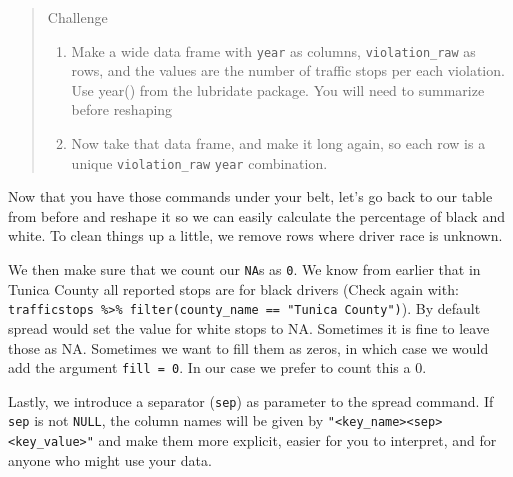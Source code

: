 \documentclass[]{book}
\newenvironment{Shaded}{\begin{snugshade}}{\end{snugshade}}
\newcommand{\KeywordTok}[1]{\textcolor[rgb]{0.13,0.29,0.53}{\textbf{#1}}}
\newcommand{\DataTypeTok}[1]{\textcolor[rgb]{0.13,0.29,0.53}{#1}}
\newcommand{\DecValTok}[1]{\textcolor[rgb]{0.00,0.00,0.81}{#1}}
\newcommand{\StringTok}[1]{\textcolor[rgb]{0.31,0.60,0.02}{#1}}
\newcommand{\OperatorTok}[1]{\textcolor[rgb]{0.81,0.36,0.00}{\textbf{#1}}}
\newcommand{\NormalTok}[1]{#1}
\theoremstyle{definition}
\theoremstyle{definition}
\theoremstyle{definition}
\theoremstyle{remark}
\begin{document}
\begin{quote}
Challenge

\begin{enumerate}
\def\labelenumi{\arabic{enumi}.}
\item
  Make a wide data frame with \texttt{year} as columns,
  \texttt{violation\_raw} as rows, and the values are the number of
  traffic stops per each violation. Use year() from the lubridate
  package. You will need to summarize before reshaping
\item
  Now take that data frame, and make it long again, so each row is a
  unique \texttt{violation\_raw} \texttt{year} combination.
\end{enumerate}
\end{quote}

Now that you have those commands under your belt, let's go back to our
table from before and reshape it so we can easily calculate the
percentage of black and white. To clean things up a little, we remove
rows where driver race is unknown.

We then make sure that we count our \texttt{NA}s as \texttt{0}. We know
from earlier that in Tunica County all reported stops are for black
drivers (Check again with:
\texttt{trafficstops\ \%\textgreater{}\%\ filter(county\_name\ ==\ "Tunica\ County")}).
By default spread would set the value for white stops to NA. Sometimes
it is fine to leave those as NA. Sometimes we want to fill them as
zeros, in which case we would add the argument \texttt{fill\ =\ 0}. In
our case we prefer to count this a 0.

Lastly, we introduce a separator (\texttt{sep}) as parameter to the
spread command. If \texttt{sep} is not \texttt{NULL}, the column names
will be given by
\texttt{"\textless{}key\_name\textgreater{}\textless{}sep\textgreater{}\textless{}key\_value\textgreater{}"}
and make them more explicit, easier for you to interpret, and for anyone
who might use your data.

\begin{Shaded}
\end{Shaded}
\end{document}
